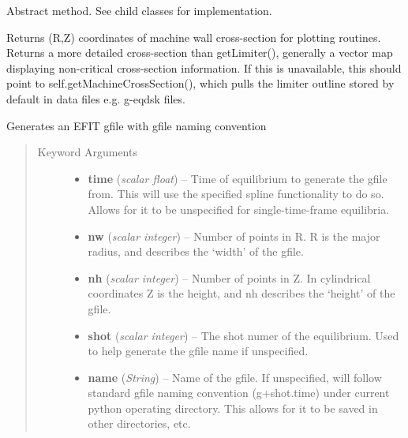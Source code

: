 \documentclass[letterpaper,10pt,english]{sphinxmanual}
\begin{document}
\begin{fulllineitems}
\begin{fulllineitems}
\label{eqtools:eqtools.core.Equilibrium.getMachineCrossSectionFull}
Abstract method.  See child classes for implementation.

Returns (R,Z) coordinates of machine wall cross-section for plotting routines.
Returns a more detailed cross-section than getLimiter(), generally a vector map
displaying non-critical cross-section information.  If this is unavailable, this
should point to self.getMachineCrossSection(), which pulls the limiter outline
stored by default in data files e.g. g-eqdsk files.

\end{fulllineitems}


\begin{fulllineitems}
\label{eqtools:eqtools.core.Equilibrium.gfile}
Generates an EFIT gfile with gfile naming convention
\begin{quote}\begin{description}
\item[{Keyword Arguments}] \leavevmode\begin{itemize}
\item {} 
\textbf{time} (\emph{scalar float}) --
Time of equilibrium to
generate the gfile from. This will use the specified
spline functionality to do so. Allows for it to be
unspecified for single-time-frame equilibria.

\item {} 
\textbf{nw} (\emph{scalar integer}) --
Number of points in R.
R is the major radius, and describes the `width' of the
gfile.

\item {} 
\textbf{nh} (\emph{scalar integer}) --
Number of points in Z. In cylindrical
coordinates Z is the height, and nh describes the `height'
of the gfile.

\item {} 
\textbf{shot} (\emph{scalar integer}) --
The shot numer of the equilibrium.
Used to help generate the gfile name if unspecified.

\item {} 
\textbf{name} (\emph{String}) --
Name of the gfile.  If unspecified, will follow
standard gfile naming convention (g+shot.time) under current
python operating directory.  This allows for it to be saved
in other directories, etc.


\end{itemize}
\end{description}
\end{quote}
\end{fulllineitems}
\end{fulllineitems}
\end{document}
